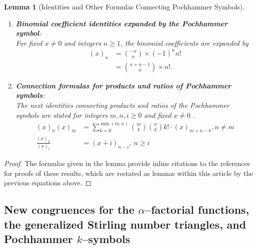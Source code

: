 \documentclass[12pt,reqno]{article}
\numberwithin{sfootnote}{section}
\numberwithin{equation}{section}
\newcommand{\itemlabel}[1]{\textbf{#1}: \\ }
\theoremstyle{plain}
\newtheorem{lemma}[theorem]{Lemma}
\theoremstyle{definition}
\theoremstyle{remark}
\newcommand{\Pochhammer}[2]{\ensuremath{\left(#1\right)_{#2}}}
\begin{document}
\begin{lemma}[Identities and Other Formulas Connecting Pochhammer Symbols]
\begin{enumerate}
\item \itemlabel{Binomial coefficient identities expanded by the 
                 Pochhammer symbol} 
For fixed $x \neq 0$ and integers $n \geq 1$, the 
binomial coefficients are expanded by 
\citep{CVLPOLYS,WOLFRAMFNSSITE-INTRO-FACTBINOMS} 
\begin{align*} 
\tag{\em Binomial Coefficient Identities} 
\Pochhammer{x}{n} 
     & = 
     \binom{-x}{n} \times (-1)^{n} n! \\ 
     & = 
     \binom{x+n-1}{n} \times n!. 
\end{align*} 

\item \itemlabel{Connection formulas for products and 
                 ratios of Pochhammer symbols} 
The next identities connecting products and ratios of the 
Pochhammer symbols are stated 
for integers $m, n, i \geq 0$ and fixed $x \neq 0$
\citep[Ex.\ 1.23, p.\ 83]{ADVCOMB} 
\citep{WOLFRAMFNSSITE-INTRO-FACTBINOMS}. 
\begin{align*} 
\tag{\em Connection Formulas for Products} 
\Pochhammer{x}{n} \Pochhammer{x}{m} 
     & = 
     \sum_{k=0}^{\min(m, n)} \binom{m}{k} \binom{n}{k} k! \cdot 
     \Pochhammer{x}{m+n-k}, n \neq m \\ 
\tag{\em Fractions of Pochhammer Symbols} 
\frac{\Pochhammer{x}{n}}{\Pochhammer{x}{i}} 
     & = 
     \Pochhammer{x+i}{n-i},\ n \geq i 
\end{align*} 

\end{enumerate} 
\end{lemma} 
\begin{proof} 
The formulas given in the lemma provide inline citations to the 
references for proofs of these 
results, which are restated as lemmas within this article by 
the previous equations above. 
\end{proof} 

\subsection{New congruences for the 
            $\alpha$--factorial functions, the 
            generalized Stirling number triangles, and 
            Pochhammer $k$--symbols} 
\label{subSection_NewCongruence_Relations_Modulo_Integer_Bases} 
\label{subSection_Congruences_for_Series_ModuloIntegers_p} 
\end{document}
